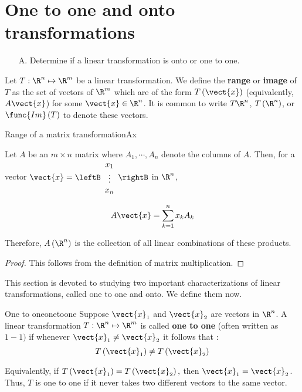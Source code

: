 \section{One to one and onto transformations}

\begin{outcome}
\begin{enumerate}
\item[A.]  Determine if a linear transformation is onto or one to one.
\end{enumerate}
\end{outcome}

Let $T: \R^n \mapsto \R^m$ be a linear transformation. We define the \textbf{range} or \textbf{image} of $T$ as the set of vectors of $\R^{m}$ which are of the form
$T \left(\vect{x}\right)$ (equivalently, $A\vect{x}$) for some $\vect{x}\in \R^{n}$. It is common
to write $T\R^{n}$, $T\left( \R^{n}\right)$, or
$\func{Im}\left( T\right) $ to denote these vectors.  

\begin{lemma}{Range of a matrix transformation}{Ax}

Let $A$ be an $m\times n$ matrix where $A_{1},\cdots , A_{n}$ denote the columns of
$A$. Then, for a vector $\vect{x}=\leftB 
\begin{array}{c}
x_{1} \\
\vdots \\
 x_{n}
\end{array}
\rightB$ in $\R^n$,

\begin{equation*}
A\vect{x}=\sum_{k=1}^{n}x_{k}A_{k}
\end{equation*}

Therefore, $A \left( \R^n \right)$ is the collection of all
linear combinations of these products.
\end{lemma}

\begin{proof}
This follows from the definition of matrix multiplication.
\end{proof}

This section is devoted to studying two important characterizations of linear transformations, called one to one and onto. We define them now. 

\begin{definition}{One to one}{onetoone}
Suppose $\vect{x}_1$ and $\vect{x}_2$ are vectors in $\R^n$. A linear transformation $T: \R^n \mapsto \R^m$ is called \textbf{one to one} (often written as $1-1)$ if whenever
 $\vect{x}_1 \neq \vect{x}_2$ it follows that :
\begin{equation*}
T\left( \vect{x}_1 \right) \neq T \left(\vect{x}_2\right)
\end{equation*}

Equivalently, if $T\left( \vect{x}_1 \right) =T\left( \vect{x}_2\right) ,$
then $\vect{x}_1 = \vect{x}_2$. Thus,  $T$ is one to one if it never takes two different
vectors to the same vector.
\end{definition}

